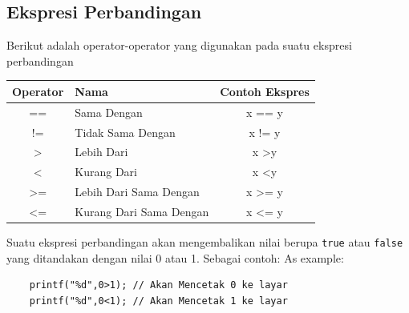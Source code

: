 \subsection{Ekspresi Perbandingan}
Berikut adalah operator-operator yang digunakan pada suatu ekspresi perbandingan
\begin{center}
	\begin{tabular}{|c|l|c|}
		\hline
		Operator        & Nama                                 & \multicolumn{1}{l|}{Contoh Ekspres} \\ \hline
		==              & Sama Dengan	                             & x == y                       \\ \hline
		!=              & Tidak Sama Dengan	                         & x != y                       \\ \hline
		\textgreater{}  & Lebih Dari                          & x \textgreater y             \\ \hline
		\textless{}     & Kurang Dari                           & x \textless y                \\ \hline
		\textgreater{}= & Lebih Dari Sama Dengan			 	 & x \textgreater{}= y          \\ \hline
		\textless{}=    & Kurang Dari Sama Dengan           		 & x \textless{}= y             \\ \hline
	\end{tabular}
\end{center}

Suatu ekspresi perbandingan akan mengembalikan nilai berupa \verb|true| atau \verb|false| yang ditandakan dengan nilai 0 atau 1.
Sebagai contoh:
As example:
\begin{verbatim}
    printf("%d",0>1); // Akan Mencetak 0 ke layar
    printf("%d",0<1); // Akan Mencetak 1 ke layar 
\end{verbatim}

